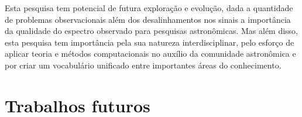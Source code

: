 Esta pesquisa tem potencial de futura exploração e evolução, dada a quantidade de problemas observacionais além dos desalinhamentos nos sinais a importância da qualidade do espectro observado para pesquisas astronômicas. Mas além disso, esta pesquisa tem importância pela sua natureza interdisciplinar, pelo esforço de aplicar teoria e métodos computacionais no auxílio da comunidade astronômica e por criar um vocabulário unificado entre importantes áreas do conhecimento.

\section{Trabalhos futuros}


